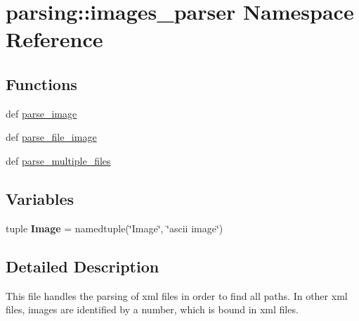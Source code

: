 \hypertarget{namespaceparsing_1_1images__parser}{\section{parsing\-:\-:images\-\_\-parser \-Namespace \-Reference}
\label{namespaceparsing_1_1images__parser}
}
\subsection*{\-Functions}
\begin{DoxyCompactItemize}
\item 
def \hyperlink{namespaceparsing_1_1images__parser_abc63de1fb7de024b823a5fcbce5f1c85}{parse\-\_\-image}
\item 
def \hyperlink{namespaceparsing_1_1images__parser_a0dfb3e65eece3fa74f5d270edeefdcc1}{parse\-\_\-file\-\_\-image}
\item 
def \hyperlink{namespaceparsing_1_1images__parser_a996ac3d69704aa18aaa5bf511150ffd3}{parse\-\_\-multiple\-\_\-files}
\end{DoxyCompactItemize}
\subsection*{\-Variables}
\begin{DoxyCompactItemize}
\item 
\hypertarget{namespaceparsing_1_1images__parser_ae8789296676e45d90ba1fea61c4b06aa}{tuple {\bfseries \-Image} = namedtuple(\char`\"{}\-Image\char`\"{}, \char`\"{}ascii image\char`\"{})}\label{namespaceparsing_1_1images__parser_ae8789296676e45d90ba1fea61c4b06aa}

\end{DoxyCompactItemize}


\subsection{\-Detailed \-Description}
\begin{DoxyVerb}
This file handles the parsing of xml files in order to find all paths.
In other xml files, images are identified by a number, which is bound
in xml files.
\end{DoxyVerb}
 

